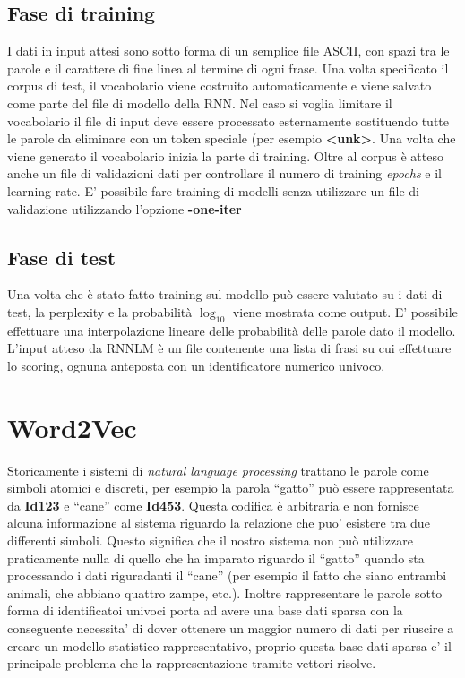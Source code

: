 \documentclass[a4paper,12pt,openright,twoside]{report}
\theoremstyle{definition}
\begin{document}
\subsection{Fase di training}
I dati in input attesi sono sotto forma di un semplice file ASCII, con spazi tra le parole e il carattere di
fine linea al termine di ogni frase.
Una volta specificato il corpus di test, il vocabolario viene costruito automaticamente e viene salvato come parte
del file di modello della RNN.
Nel caso si voglia limitare il vocabolario il file di input deve essere processato esternamente sostituendo
tutte le parole da eliminare con un token speciale (per esempio \textbf{<unk>}.
Una volta che viene generato il vocabolario inizia la parte di training. Oltre al corpus è atteso anche un
file di validazioni dati per controllare il numero di training \emph{epochs} e  il learning rate.
E' possibile fare training di modelli senza utilizzare un file di validazione utilizzando l'opzione \textbf{-one-iter}
\subsection{Fase di test}
Una volta che è stato fatto training sul modello può essere valutato su i dati di test, la perplexity e la 
probabilità $\log_{10}$ viene mostrata come output.
E' possibile effettuare una interpolazione lineare delle probabilità delle parole dato il modello. L'input atteso
da RNNLM è un file contenente una lista di frasi su cui effettuare lo scoring, ognuna anteposta con un identificatore
numerico univoco.
\section{Word2Vec}
Storicamente i sistemi di \emph{natural language processing} trattano le parole come simboli atomici e discreti,
per esempio la parola ``gatto'' può essere rappresentata da \textbf{Id123} e ``cane'' come \textbf{Id453}.
Questa codifica è arbitraria e non fornisce alcuna informazione al sistema riguardo la relazione
che puo' esistere tra due differenti simboli.
Questo significa che il nostro sistema non può utilizzare praticamente nulla di quello che ha imparato
riguardo il ``gatto'' quando sta processando i dati riguradanti il ``cane'' (per esempio il fatto che siano
entrambi animali, che abbiano quattro zampe, etc.).
Inoltre rappresentare le parole sotto forma di identificatoi univoci porta ad avere una base dati sparsa
con la conseguente necessita' di dover ottenere un maggior numero di dati per riuscire a creare un modello
statistico rappresentativo, proprio questa base dati sparsa e' il principale problema che la 
rappresentazione tramite vettori risolve.
\end{document}
